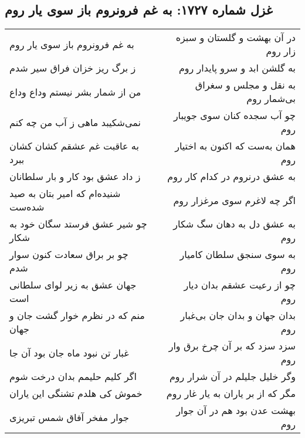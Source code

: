 \begin{center}
\section*{غزل شماره ۱۷۲۷: به غم فرونروم باز سوی یار روم}
\label{sec:1727}
\begin{longtable}{l p{0.5cm} r}
به غم فرونروم باز سوی یار روم
&&
در آن بهشت و گلستان و سبزه زار روم
\\
ز برگ ریز خزان فراق سیر شدم
&&
به گلشن ابد و سرو پایدار روم
\\
من از شمار بشر نیستم وداع وداع
&&
به نقل و مجلس و سغراق بی‌شمار روم
\\
نمی‌شکیبد ماهی ز آب من چه کنم
&&
چو آب سجده کنان سوی جویبار روم
\\
به عاقبت غم عشقم کشان کشان ببرد
&&
همان به‌ست که اکنون به اختیار روم
\\
ز داد عشق بود کار و بار سلطانان
&&
به عشق درنروم در کدام کار روم
\\
شنیده‌ام که امیر بتان به صید شده‌ست
&&
اگر چه لاغرم سوی مرغزار روم
\\
چو شیر عشق فرستد سگان خود به شکار
&&
به عشق دل به دهان سگ شکار روم
\\
چو بر براق سعادت کنون سوار شدم
&&
به سوی سنجق سلطان کامیار روم
\\
جهان عشق به زیر لوای سلطانی است
&&
چو از رعیت عشقم بدان دیار روم
\\
منم که در نظرم خوار گشت جان و جهان
&&
بدان جهان و بدان جان بی‌غبار روم
\\
غبار تن نبود ماه جان بود آن جا
&&
سزد سزد که بر آن چرخ برق وار روم
\\
اگر کلیم حلیمم بدان درخت شوم
&&
وگر خلیل جلیلم در آن شرار روم
\\
خموش کی هلدم تشنگی این یاران
&&
مگر که از بر یاران به یار غار روم
\\
جوار مفخر آفاق شمس تبریزی
&&
بهشت عدن بود هم در آن جوار روم
\\
\end{longtable}
\end{center}
